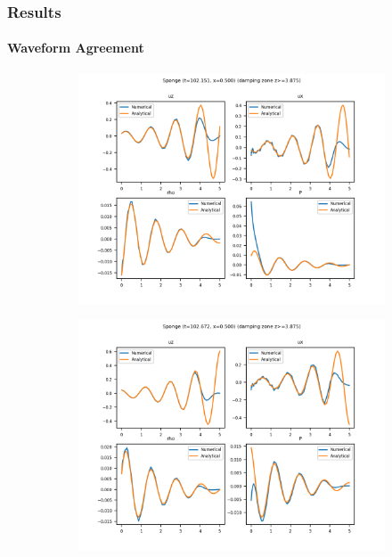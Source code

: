 \documentclass[dvipsnames]{beamer}
\begin{document}
\begin{frame}
    \frametitle{Results}
    \framesubtitle{Waveform Agreement}

    \begin{figure}[!h]
        \centering
        \begin{subfigure}{0.37\textwidth}
            \centering
            \includegraphics[width=\textwidth]{../sims/2d_strat/agree_plots/sponge_0.png}
        \end{subfigure}
        \begin{subfigure}{0.37\textwidth}
            \centering
            \includegraphics[width=\textwidth]{../sims/2d_strat/agree_plots/sponge_1.png}
        \end{subfigure}


\end{figure}
\end{frame}
\end{document}

